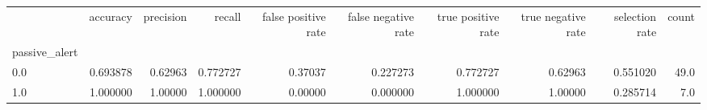\begin{tabular}{lrrrrrrrrr}
\toprule
{} &  accuracy &  precision &    recall &  false positive rate &  false negative rate &  true positive rate &  true negative rate &  selection rate &  count \\
passive\_alert &           &            &           &                      &                      &                     &                     &                 &        \\
\midrule
0.0           &  0.693878 &    0.62963 &  0.772727 &              0.37037 &             0.227273 &            0.772727 &             0.62963 &        0.551020 &   49.0 \\
1.0           &  1.000000 &    1.00000 &  1.000000 &              0.00000 &             0.000000 &            1.000000 &             1.00000 &        0.285714 &    7.0 \\
\bottomrule
\end{tabular}
